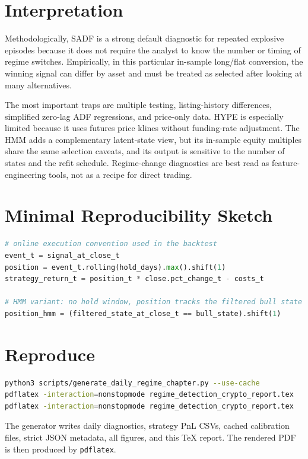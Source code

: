 \documentclass[11pt]{article}
\begin{document}
\section{Interpretation}

Methodologically, SADF is a strong default diagnostic for repeated explosive episodes because it does not require the analyst to know the number or timing of regime switches. Empirically, in this particular in-sample long/flat conversion, the winning signal can differ by asset and must be treated as selected after looking at many alternatives.

The most important traps are multiple testing, listing-history differences, simplified zero-lag ADF regressions, and price-only data. HYPE is especially limited because it uses futures price klines without funding-rate adjustment. The HMM adds a complementary latent-state view, but its in-sample equity multiples share the same selection caveats, and its output is sensitive to the number of states and the refit schedule. Regime-change diagnostics are best read as feature-engineering tools, not as a recipe for direct trading.

\section{Minimal Reproducibility Sketch}

\begin{lstlisting}[language=Python]
# online execution convention used in the backtest
event_t = signal_at_close_t
position = event_t.rolling(hold_days).max().shift(1)
strategy_return_t = position_t * close.pct_change_t - costs_t

# HMM variant: no hold window, position tracks the filtered bull state
position_hmm = (filtered_state_at_close_t == bull_state).shift(1)
\end{lstlisting}

\section{Reproduce}

\begin{lstlisting}[language=bash]
python3 scripts/generate_daily_regime_chapter.py --use-cache
pdflatex -interaction=nonstopmode regime_detection_crypto_report.tex
pdflatex -interaction=nonstopmode regime_detection_crypto_report.tex
\end{lstlisting}

The generator writes daily diagnostics, strategy PnL CSVs, cached calibration files, strict JSON metadata, all figures, and this TeX report. The rendered PDF is then produced by \texttt{pdflatex}.
\end{document}
